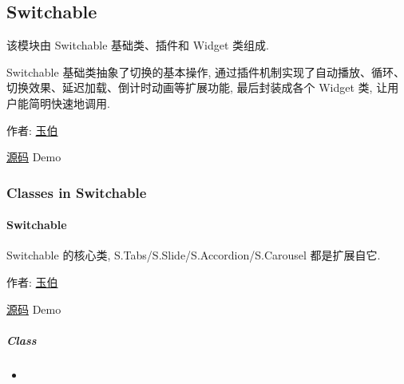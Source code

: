 \documentclass[letterpaper,10pt,english]{sphinxmanual}
\begin{document}
\subsection{Switchable}
\label{api/component/switchable/index::doc}\label{api/component/switchable/index:switchable}
\begin{DUlineblock}{0em}
\item[] 该模块由 Switchable 基础类、插件和 Widget 类组成.
\item[] Switchable 基础类抽象了切换的基本操作, 通过插件机制实现了自动播放、循环、切换效果、延迟加载、倒计时动画等扩展功能, 最后封装成各个 Widget 类, 让用户能简明快速地调用.
\item[] 作者: \href{mailto:lifesinger@gmail.com}{玉伯}
\item[] \href{https://github.com/kissyteam/kissy/tree/master/src/switchable/}{源码} \textbar{} Demo
\end{DUlineblock}


\subsubsection{Classes in Switchable}
\label{api/component/switchable/index:classes-in-switchable}\label{api/component/switchable/switchable:module-Switchable}

\paragraph{Switchable}
\label{api/component/switchable/switchable::doc}\label{api/component/switchable/switchable:switchable}
\begin{DUlineblock}{0em}
\item[] Switchable 的核心类, S.Tabs/S.Slide/S.Accordion/S.Carousel 都是扩展自它.
\item[] 作者: \href{mailto:lifesinger@gmail.com}{玉伯}
\item[] \href{https://github.com/kissyteam/kissy/tree/master/src/switchable/}{源码} \textbar{} Demo
\end{DUlineblock}


\subparagraph{Class}
\label{api/component/switchable/switchable:class}\begin{itemize}
\item {}
{\hyperref[api/component/switchable/switchable:Switchable.Switchable]{}}

\end{itemize}
\end{document}
